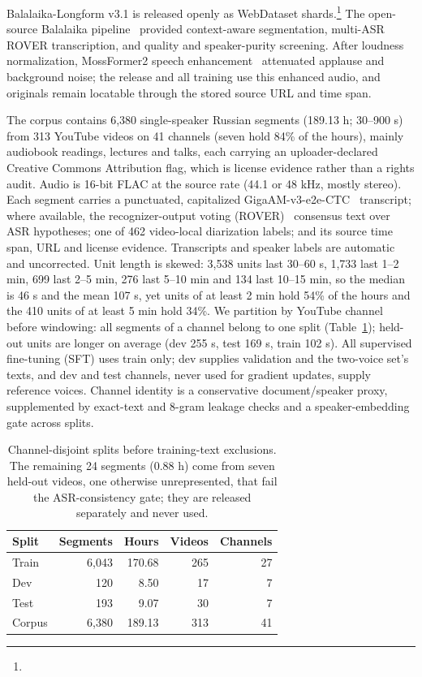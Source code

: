 \documentclass{article}
\newcommand{\corpus}{Balalaika-Longform}
\begin{document}
\corpus{} v3.1 is released openly as WebDataset shards.\footnote{\datasetlink} The open-source Balalaika pipeline~\cite{borodin2026balalaika} provided context-aware
segmentation, multi-ASR ROVER transcription, and quality and speaker-purity screening.
After loudness normalization, MossFormer2 speech
enhancement~\cite{zhao2024mossformer2} attenuated applause and background noise; the release and all training use this enhanced audio, and originals remain
locatable through the stored source URL and time span.

The corpus contains 6,380 single-speaker Russian segments (189.13 h; 30--900 s)
from 313 YouTube videos on 41 channels (seven hold 84\% of the hours), mainly
audiobook readings, lectures and talks, each carrying an uploader-declared Creative Commons Attribution flag,
which is license evidence rather than a rights audit.  Audio is
16-bit FLAC at the source rate (44.1 or 48 kHz, mostly stereo).  Each segment
carries a punctuated, capitalized GigaAM-v3-e2e-CTC~\cite{kutsakov2025gigaam}
transcript; where available, the recognizer-output voting
(ROVER)~\cite{fiscus1997rover} consensus text over ASR hypotheses; one of 462
video-local diarization labels; and its source time span, URL and license evidence.
Transcripts and speaker labels are automatic and uncorrected.  Unit length is skewed: 3,538 units last 30--60 s, 1,733 last 1--2 min, 699 last
2--5 min, 276 last 5--10 min and 134 last 10--15 min, so the median is 46 s and
the mean 107 s, yet units of at least 2 min hold 54\% of the hours and the 410 units of
at least 5 min hold 34\%.  We partition by YouTube channel before windowing: all
segments of a channel belong to one split (Table~\ref{tab:splits}); held-out
units are longer on average (dev 255 s, test 169 s, train 102 s).  All supervised
fine-tuning (SFT) uses train only; dev supplies validation and the two-voice set's
texts, and dev and test channels, never used for gradient updates, supply
reference voices.  Channel identity is a conservative document/speaker proxy,
supplemented by exact-text and 8-gram leakage checks and a speaker-embedding
gate across splits.

\begin{table}[!ht]
    \caption{Channel-disjoint splits before training-text exclusions. The remaining
  24 segments (0.88 h) come from seven held-out videos, one otherwise unrepresented,
  that fail the ASR-consistency gate; they are released separately and never used.}
  \label{tab:splits}
  \centering
  \small
  \setlength{\tabcolsep}{4pt}
  \begin{tabular}{lrrrr}
    \toprule
    Split & Segments & Hours & Videos & Channels\\
    \midrule
    Train & 6,043 & 170.68 & 265 & 27\\
    Dev   & 120   & 8.50   & 17 & 7\\
    Test  & 193   & 9.07   & 30 & 7\\
    \midrule
    Corpus & 6,380 & 189.13 & 313 & 41\\
    \bottomrule
  \end{tabular}
\end{table}
\end{document}
